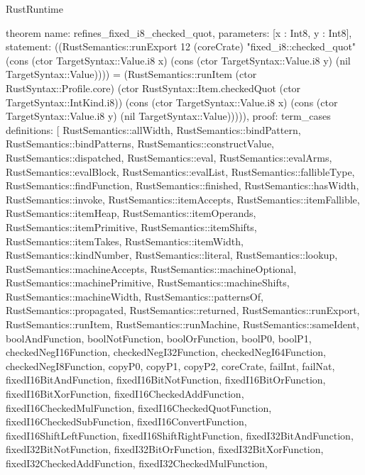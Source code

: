 \begin{lexlean}{RustRuntime}
\begin{semanticmodule}
theorem{
  name: refines_fixed_i8_checked_quot,
  parameters: [x : Int8, y : Int8],
  statement: ((RustSemantics::runExport 12 (coreCrate) "fixed_i8::checked_quot" (cons (ctor TargetSyntax::Value.i8 x) (cons (ctor TargetSyntax::Value.i8 y) (nil TargetSyntax::Value)))) = (RustSemantics::runItem (ctor RustSyntax::Profile.core) (ctor RustSyntax::Item.checkedQuot (ctor TargetSyntax::IntKind.i8)) (cons (ctor TargetSyntax::Value.i8 x) (cons (ctor TargetSyntax::Value.i8 y) (nil TargetSyntax::Value))))),
  proof: term_cases{
    definitions: [
      RustSemantics::allWidth,
      RustSemantics::bindPattern,
      RustSemantics::bindPatterns,
      RustSemantics::constructValue,
      RustSemantics::dispatched,
      RustSemantics::eval,
      RustSemantics::evalArms,
      RustSemantics::evalBlock,
      RustSemantics::evalList,
      RustSemantics::fallibleType,
      RustSemantics::findFunction,
      RustSemantics::finished,
      RustSemantics::hasWidth,
      RustSemantics::invoke,
      RustSemantics::itemAccepts,
      RustSemantics::itemFallible,
      RustSemantics::itemHeap,
      RustSemantics::itemOperands,
      RustSemantics::itemPrimitive,
      RustSemantics::itemShifts,
      RustSemantics::itemTakes,
      RustSemantics::itemWidth,
      RustSemantics::kindNumber,
      RustSemantics::literal,
      RustSemantics::lookup,
      RustSemantics::machineAccepts,
      RustSemantics::machineOptional,
      RustSemantics::machinePrimitive,
      RustSemantics::machineShifts,
      RustSemantics::machineWidth,
      RustSemantics::patternsOf,
      RustSemantics::propagated,
      RustSemantics::returned,
      RustSemantics::runExport,
      RustSemantics::runItem,
      RustSemantics::runMachine,
      RustSemantics::sameIdent,
      boolAndFunction,
      boolNotFunction,
      boolOrFunction,
      boolP0,
      boolP1,
      checkedNegI16Function,
      checkedNegI32Function,
      checkedNegI64Function,
      checkedNegI8Function,
      copyP0,
      copyP1,
      copyP2,
      coreCrate,
      failInt,
      failNat,
      fixedI16BitAndFunction,
      fixedI16BitNotFunction,
      fixedI16BitOrFunction,
      fixedI16BitXorFunction,
      fixedI16CheckedAddFunction,
      fixedI16CheckedMulFunction,
      fixedI16CheckedQuotFunction,
      fixedI16CheckedSubFunction,
      fixedI16ConvertFunction,
      fixedI16ShiftLeftFunction,
      fixedI16ShiftRightFunction,
      fixedI32BitAndFunction,
      fixedI32BitNotFunction,
      fixedI32BitOrFunction,
      fixedI32BitXorFunction,
      fixedI32CheckedAddFunction,
      fixedI32CheckedMulFunction,
}}
\end{semanticmodule}
\end{lexlean}
